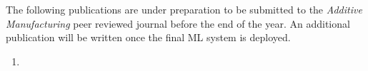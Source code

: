 \documentclass[main.tex]{subfiles}
\begin{document}
The following publications are under preparation to be submitted to the \emph{Additive Manufacturing} peer reviewed journal before the end of the year. An additional publication will be written once the final ML system is deployed.

\begin{enumerate}
	\item {}
\end{enumerate}

% 
%
%
%
%

\end{document}
